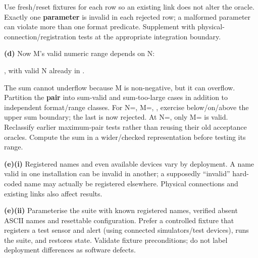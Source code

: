 \begin{studycolumns}
\vspace{0pt}

Use fresh/\allowbreak{}reset fixtures for each row so an existing link does not alter the oracle. Exactly one \textbf{parameter} is invalid in each rejected row; a malformed parameter can violate more than one format predicate. Supplement with physical-connection/\allowbreak{}registration tests at the appropriate integration boundary.

\textbf{(d)} Now M's valid numeric range depends on N:

, with valid N already in .

The sum cannot underflow because M is non-negative, but it can overflow. Partition the \textbf{pair}  into sum-valid and sum-too-large cases in addition to independent format/\allowbreak{}range classes. For N=, M=, ,  exercise below/\allowbreak{}on/\allowbreak{}above the upper sum boundary; the last is now rejected. At N=, only M= is valid. Reclassify earlier maximum-pair tests rather than reusing their old acceptance oracles. Compute the sum in a wider/\allowbreak{}checked representation before testing its range.

\textbf{(e)(i)} Registered names and even available devices vary by deployment. A name valid in one installation can be invalid in another; a supposedly ``invalid'' hard-coded name may actually be registered elsewhere. Physical connections and existing links also affect results.

\textbf{(e)(ii)} Parameterise the suite with known registered names, verified absent ASCII names and resettable configuration. Prefer a controlled fixture that registers a test sensor and alert (using connected simulators/\allowbreak{}test devices), runs the suite, and restores state. Validate fixture preconditions; do not label deployment differences as software defects.
\end{studycolumns}

